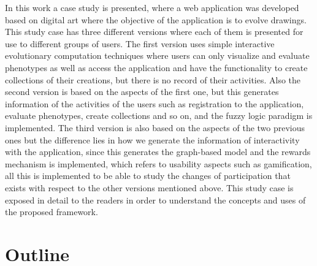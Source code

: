 \par In this work a case study is presented, where a web application was
developed based on digital art where the objective of the application is to
evolve drawings. This study case has three different versions where each of them
is presented for use to different groups of users. The first version uses simple
interactive evolutionary computation techniques where users can only visualize
and evaluate phenotypes as well as access the application and have the
functionality to create collections of their creations, but there is no record
of their activities. Also the second version is based on the aspects of the
first one, but this generates information of the activities of the users such as
registration to the application, evaluate phenotypes, create collections and so
on, and the fuzzy logic paradigm is implemented.  The third version is also
based on the aspects of the two previous ones but the difference lies in how we
generate the information of interactivity with the application, since this
generates the graph-based model and the rewards mechanism is implemented, which
refers to usability aspects such as gamification, all this is implemented to be
able to study the changes of participation that exists with respect to the other
versions mentioned above. This study case is exposed in detail to the readers in
order to understand the concepts and uses of the proposed framework.



\section{Outline}

